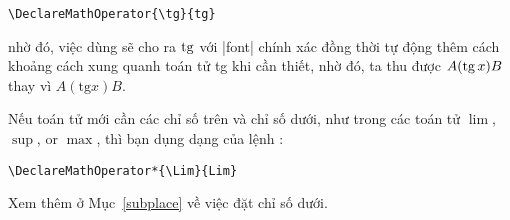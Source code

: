 \begin{verbatim}
\DeclareMathOperator{\tg}{tg}
\end{verbatim}
nhờ đó, việc dùng  sẽ cho ra $\tg$ với |font| chính xác
đồng thời tự động thêm cách khoảng cách xung quanh toán tử {\upshape tg}
khi cần thiết, nhờ đó, ta thu được $A(\tg x)B$ thay vì $A(\mathrm{tg}x)B$.

\medskip
Nếu toán tử mới cần các chỉ số trên và chỉ số dưới, như trong các toán tử
$\lim$, $\sup$, or $\max$, thì bạn dụng dạng \qc{\*} của lệnh :

\medskip
\begin{verbatim}
\DeclareMathOperator*{\Lim}{Lim}
\end{verbatim}

\medskip\noindent
Xem thêm ở Mục~\ref{subplace} về việc đặt chỉ số dưới.

